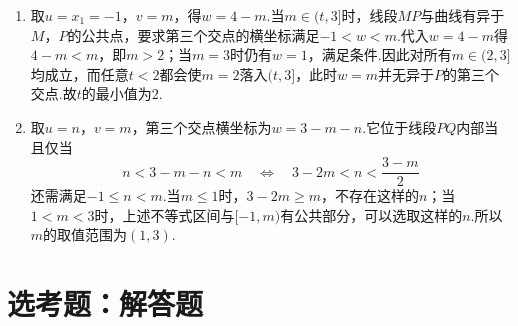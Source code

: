 \begin{problem}
\begin{solution}
\begin{enumerate}
\begin{enumerate}
\item 取\(u=x_1=-1\)，\(v=m\)，得\(w=4-m\).当\(m\in(t,3]\)时，线段\(MP\)与曲线有异于\(M\)，\(P\)的公共点，要求第三个交点的横坐标满足\(-1<w<m\).代入\(w=4-m\)得\(4-m<m\)，即\(m>2\)；当\(m=3\)时仍有\(w=1\)，满足条件.因此对所有\(m\in(2,3]\)均成立，而任意\(t<2\)都会使\(m=2\)落入\((t,3]\)，此时\(w=m\)并无异于\(P\)的第三个交点.故\(t\)的最小值为\(2\).

\item 取\(u=n\)，\(v=m\)，第三个交点横坐标为\(w=3-m-n\).它位于线段\(PQ\)内部当且仅当
\[
n<3-m-n<m
\quad\Longleftrightarrow\quad
3-2m<n<\frac{3-m}{2}
\]
还需满足\(-1\leqslant n<m\).当\(m\leqslant1\)时，\(3-2m\geqslant m\)，不存在这样的\(n\)；当\(1<m<3\)时，上述不等式区间与\([-1,m)\)有公共部分，可以选取这样的\(n\).所以\(m\)的取值范围为\((1,3)\).
\end{enumerate}
\end{enumerate}
\end{solution}
\end{problem}

\section{选考题：解答题}


